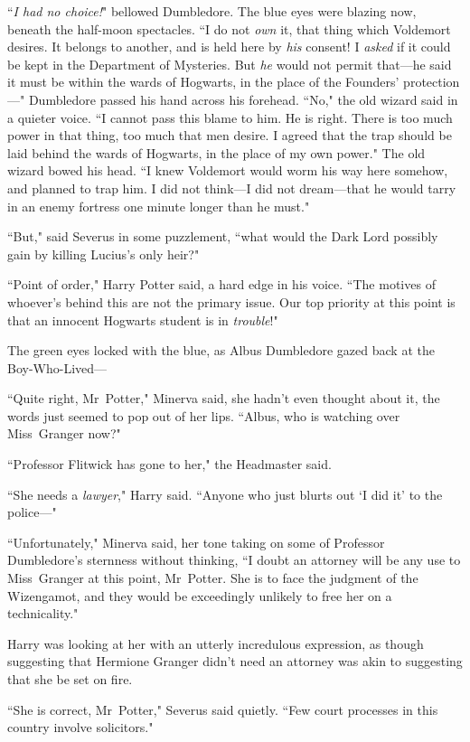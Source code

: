 ``\emph{I had no choice!}" bellowed Dumbledore. The blue eyes were blazing now, beneath the half-moon spectacles. ``I do not \emph{own} it, that thing which Voldemort desires. It belongs to another, and is held here by \emph{his} consent! I \emph{asked} if it could be kept in the Department of Mysteries. But \emph{he} would not permit that—he said it must be within the wards of Hogwarts, in the place of the Founders' protection—" Dumbledore passed his hand across his forehead. ``No," the old wizard said in a quieter voice. ``I cannot pass this blame to him. He is right. There is too much power in that thing, too much that men desire. I agreed that the trap should be laid behind the wards of Hogwarts, in the place of my own power." The old wizard bowed his head. ``I knew Voldemort would worm his way here somehow, and planned to trap him. I did not think—I did not dream—that he would tarry in an enemy fortress one minute longer than he must."

``But," said Severus in some puzzlement, ``what would the Dark Lord possibly gain by killing Lucius's only heir?"

``Point of order," Harry Potter said, a hard edge in his voice. ``The motives of whoever's behind this are not the primary issue. Our top priority at this point is that an innocent Hogwarts student is in \emph{trouble}!"

The green eyes locked with the blue, as Albus Dumbledore gazed back at the Boy-Who-Lived—

``Quite right, Mr~Potter," Minerva said, she hadn't even thought about it, the words just seemed to pop out of her lips. ``Albus, who is watching over Miss~Granger now?"

``Professor Flitwick has gone to her," the Headmaster said.

``She needs a \emph{lawyer}," Harry said. ``Anyone who just blurts out `I did it' to the police—"

``Unfortunately," Minerva said, her tone taking on some of Professor Dumbledore's sternness without thinking, ``I doubt an attorney will be any use to Miss~Granger at this point, Mr~Potter. She is to face the judgment of the Wizengamot, and they would be exceedingly unlikely to free her on a technicality."

Harry was looking at her with an utterly incredulous expression, as though suggesting that Hermione Granger didn't need an attorney was akin to suggesting that she be set on fire.

``She is correct, Mr~Potter," Severus said quietly. ``Few court processes in this country involve solicitors."

